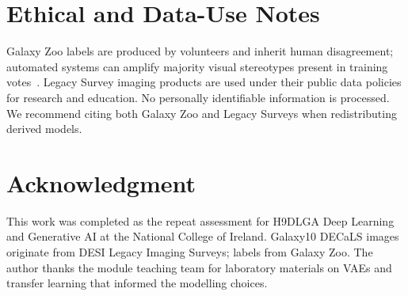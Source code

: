 \documentclass[conference]{IEEEtran}
\begin{document}
\section{Ethical and Data-Use Notes}
Galaxy Zoo labels are produced by volunteers and inherit human disagreement; automated systems can amplify majority visual stereotypes present in training votes~\cite{lintott2008galaxy}. Legacy Survey imaging products are used under their public data policies for research and education. No personally identifiable information is processed. We recommend citing both Galaxy Zoo and Legacy Surveys when redistributing derived models.

\section*{Acknowledgment}
This work was completed as the repeat assessment for H9DLGA Deep Learning and Generative AI at the National College of Ireland. Galaxy10 DECaLS images originate from DESI Legacy Imaging Surveys; labels from Galaxy Zoo. The author thanks the module teaching team for laboratory materials on VAEs and transfer learning that informed the modelling choices.
\end{document}
